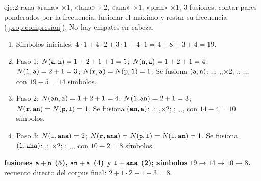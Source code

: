 \begin{solucion}{eje:2-rana}
\datos «rana» $\times1$, «lana» $\times2$, «ana» $\times1$, «plan» $\times1$; 3 fusiones.
\planteamiento contar pares ponderados por la frecuencia, fusionar el máximo y restar su frecuencia (\cref{prop:compresion}). No hay empates en cabeza.
\pasos
\begin{enumerate}[label=\arabic*.]
  \item Símbolos iniciales: $4\cdot 1+4\cdot 2+3\cdot 1+4\cdot 1=4+8+3+4=19$.
  \item Paso 1: $N(\texttt{a},\texttt{n})=1+2+1+1=5$; $N(\texttt{n},\texttt{a})=1+2+1=4$; $N(\texttt{l},\texttt{a})=2+1=3$; $N(\texttt{r},\texttt{a})=N(\texttt{p},\texttt{l})=1$. Se fusiona $(\texttt{a},\texttt{n})$: \sep{}\sep{}; \sep{}\sep{}$\times2$; \sep{}; \sep{}\sep{}, con $19-5=14$ símbolos.
  \item Paso 2: $N(\texttt{an},\texttt{a})=1+2+1=4$; $N(\texttt{l},\texttt{an})=2+1=3$; $N(\texttt{r},\texttt{an})=N(\texttt{p},\texttt{l})=1$. Se fusiona $(\texttt{an},\texttt{a})$: \sep{}; \sep{}$\times2$; ; \sep{}\sep{}, con $14-4=10$ símbolos.
  \item Paso 3: $N(\texttt{l},\texttt{ana})=2$; $N(\texttt{r},\texttt{ana})=N(\texttt{p},\texttt{l})=N(\texttt{l},\texttt{an})=1$. Se fusiona $(\texttt{l},\texttt{ana})$: \sep{}; $\times2$; ; \sep{}\sep{}, con $10-2=8$ símbolos.
\end{enumerate}
\resultado \textbf{fusiones $\texttt{a}+\texttt{n}$ (5), $\texttt{an}+\texttt{a}$ (4) y $\texttt{l}+\texttt{ana}$ (2); símbolos $19\to 14\to 10\to 8$.}
\comprobacion recuento directo del corpus final: $2+1\cdot 2+1+3=8$.
\end{solucion}

